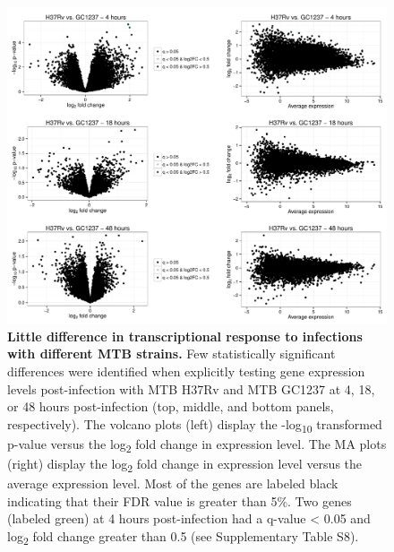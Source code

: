 \begin{figure}[htbp]
\centering
\includegraphics[width=5in]{img/ch02/fig-S07-Rv-v-GC.pdf}
\caption[Little difference in transcriptional response to infections
  with different MTB strains.]{\textbf{Little difference in
    transcriptional response to infections with different MTB
    strains.} Few statistically significant differences were
  identified when explicitly testing gene expression levels
  post-infection with MTB H37Rv and MTB GC1237 at 4, 18, or 48 hours
  post-infection (top, middle, and bottom panels, respectively). The
  volcano plots (left) display the -log\textsubscript{10} transformed
  p-value versus the log\textsubscript{2} fold change in expression
  level. The MA plots (right) display the log\textsubscript{2} fold
  change in expression level versus the average expression level. Most
  of the genes are labeled black indicating that their FDR value is
  greater than 5\%. Two genes (labeled green) at 4 hours
  post-infection had a q-value \textless{} 0.05 and
  log\textsubscript{2} fold change greater than 0.5 (see Supplementary
  Table S8).}
\label{fig:Rv-v-GC}
\end{figure}

